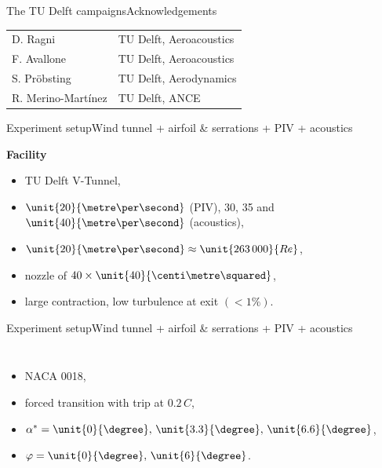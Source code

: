 \documentclass[xcolor=table,aspectratio=169]{beamer}
\begin{document}
\begin{frame}{The TU Delft campaigns}{Acknowledgements}
    \vspace{0.5cm}\hspace{1cm}
    \begin{tabular}{ll}
        D. Ragni             & T\textcolor{LMLightBlue}{U} Delft, Aeroacoustics \\
        F. Avallone          & T\textcolor{LMLightBlue}{U} Delft, Aeroacoustics \\
        S. Pr\"obsting       & T\textcolor{LMLightBlue}{U} Delft, Aerodynamics \\
        R. Merino-Mart\'inez & T\textcolor{LMLightBlue}{U} Delft, ANCE\\
    \end{tabular}
\end{frame}

\begin{frame}{Experiment setup}{\alert{Wind tunnel} + airfoil \& serrations + PIV + acoustics}

    \textcolor{LMBlue}{\bf Facility}
    \begin{itemize}
        \item TU Delft V-Tunnel,
        \item $\unit{20}{\metre\per\second}$ (PIV), 30, 35 and $\unit{40}{\metre\per\second}$ (acoustics),
        \item $\unit{20}{\metre\per\second}\approx\unit{263\,000}{Re}$,
        \item nozzle of $40\times\unit{40}{\centi\metre\squared}$,
        \item large contraction, low turbulence at exit $\left( <1\% \right)$.
    \end{itemize}
    
\end{frame}

\begin{frame}{Experiment setup}{Wind tunnel + \alert{airfoil \& serrations} + PIV + acoustics}

    \begin{columns}
        \vspace{1cm}
        \def\svgwidth{1.0\textwidth} 
        {\scriptsize }

        \begin{itemize}
            \item NACA 0018,
            \item forced transition with trip at $0.2\,C$,
            \item $\alpha^* = \unit{0}{\degree},\,\unit{3.3}{\degree},\,\unit{6.6}{\degree}$,
            \item $\varphi = \unit{0}{\degree},\,\unit{6}{\degree}$.
        \end{itemize}

    \end{columns}
    
\end{frame}
\end{document}
